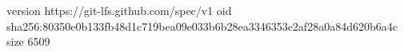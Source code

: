 version https://git-lfs.github.com/spec/v1
oid sha256:80350e0b133fb48d1c719bea09e033b6b28ea3346353c2af28a0a84d620b6a4c
size 6509
